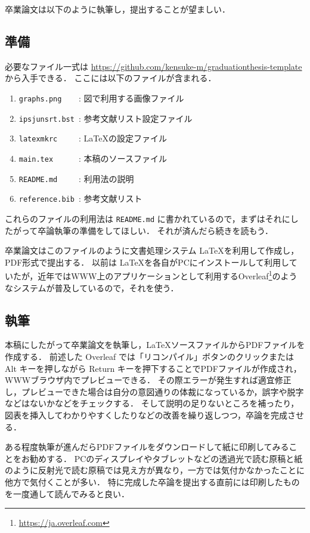 \documentclass[a4paper,twocolumn,10pt]{jsarticle}
\begin{document}
卒業論文は以下のように執筆し，提出することが望ましい．

\subsection{準備}

必要なファイル一式は \url{https://github.com/kensuke-m/graduationthesis-template} から入手できる．
ここには以下のファイルが含まれる．
\begin{enumerate}
 \item \verb|graphs.png    |: 図で利用する画像ファイル
 \item \verb|ipsjunsrt.bst |: 参考文献リスト設定ファイル
 \item \verb|latexmkrc     |: \LaTeX の設定ファイル
 \item \verb|main.tex      |: 本稿のソースファイル
 \item \verb|README.md     |: 利用法の説明
 \item \verb|reference.bib |: 参考文献リスト
\end{enumerate}
これらのファイルの利用法は {\tt README.md} に書かれているので，まずはそれにしたがって卒論執筆の準備をしてほしい．
それが済んだら続きを読もう．

卒業論文はこのファイルのように文書処理システム \LaTeX を利用して作成し，PDF形式で提出する．
以前は \LaTeX を各自がPCにインストールして利用していたが，近年ではWWW上のアプリケーションとして利用するOverleaf\footnote{\url{https://ja.overleaf.com}}のようなシステムが普及しているので，それを使う．

\subsection{執筆}

本稿にしたがって卒業論文を執筆し，\LaTeX ソースファイルからPDFファイルを作成する．
前述した Overleaf では「リコンパイル」ボタンのクリックまたは Alt キーを押しながら Return キーを押下することでPDFファイルが作成され，WWWブラウザ内でプレビューできる．
その際エラーが発生すれば適宜修正し，プレビューできた場合は自分の意図通りの体裁になっているか，誤字や脱字などはないかなどをチェックする．
そして説明の足りないところを補ったり，図表を挿入してわかりやすくしたりなどの改善を繰り返しつつ，卒論を完成させる．

ある程度執筆が進んだらPDFファイルをダウンロードして紙に印刷してみることをお勧めする．
PCのディスプレイやタブレットなどの透過光で読む原稿と紙のように反射光で読む原稿では見え方が異なり，一方では気付かなかったことに他方で気付くことが多い．
特に完成した卒論を提出する直前には印刷したものを一度通して読んでみると良い．
\end{document}
